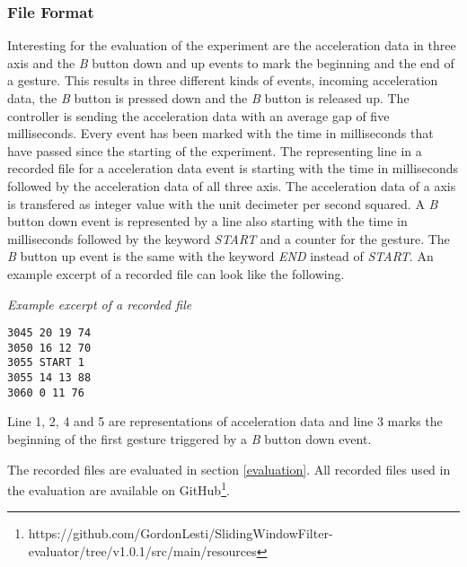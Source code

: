 \subsubsection{File Format} \label{file_format}
Interesting for the evaluation of the experiment are the acceleration data in three axis and the \textit{B} button down
and up events to mark the beginning and the end of a gesture. This results in three different kinds of events, incoming
acceleration data, the \textit{B} button is pressed down and the \textit{B} button is released up. The controller is
sending the acceleration data with an average gap of five milliseconds. Every event has been marked with the time
in milliseconds that have passed since the starting of the experiment. The representing line in a recorded file for a
acceleration data event is starting with the time in milliseconds followed by the acceleration data of all three axis.
The acceleration data of a axis is transfered as integer value with the unit decimeter per second squared. A \textit{B}
button down event is represented by a line also starting with the time in milliseconds followed by the keyword
\textit{START} and a counter for the gesture. The \textit{B} button up event is the same with the keyword \textit{END}
instead of \textit{START}. An example excerpt of a recorded file can look like the following.

\medskip
\noindent
{\it Example excerpt of a recorded file}
\begin{verbatim}
3045 20 19 74
3050 16 12 70
3055 START 1
3055 14 13 88
3060 0 11 76
\end{verbatim}
\noindent
{\small Line 1, 2, 4 and 5 are representations of acceleration data and line 3 marks the beginning of the first gesture
triggered by a \textit{B} button down event.}

\medskip

The recorded files are evaluated in section \ref{evaluation}. All
recorded files used in the evaluation are available on
GitHub\footnote{https://github.com/GordonLesti/SlidingWindowFilter-evaluator/tree/v1.0.1/src/main/resources}.
